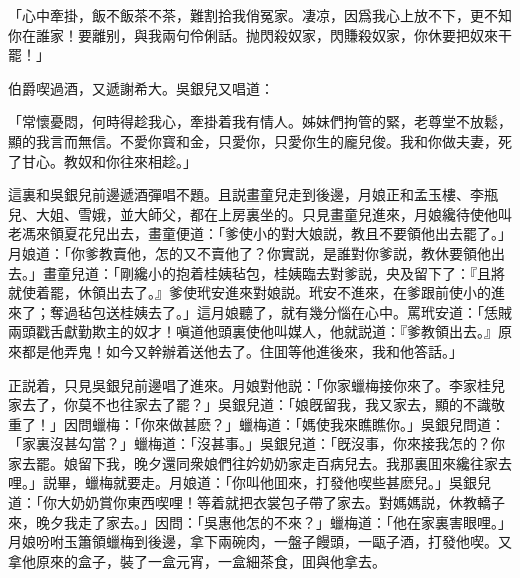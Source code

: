 \begin{myquote}
「心中牽掛，飯不飯茶不茶，難割拾我俏冤家。凄凉，因爲我心上放不下，更不知你在誰家！要離别，與我兩句伶俐話。抛閃殺奴家，閃賺殺奴家，你休要把奴來干罷！」
\end{myquote}

伯爵喫過酒，又遞謝希大。吳銀兒又唱道：

\begin{myquote}
「常懷憂悶，何時得趁我心，牽掛着我有情人。姊妹們拘管的緊，老尊堂不放鬆，顯的我言而無信。不愛你寳和金，只愛你，只愛你生的龐兒俊。我和你做夫妻，死了甘心。教奴和你往來相趁。」
\end{myquote}

這裏和吳銀兒前邊遞酒彈唱不題。且説畫童兒走到後邊，月娘正和孟玉樓、李瓶兒、大姐、雪娥，並大師父，都在上房裏坐的。只見畫童兒進來，月娘纔待使他叫老馮來領夏花兒出去，畫童便道：「爹使小的對大娘説，教且不要領他出去罷了。」月娘道：「你爹教賣他，怎的又不賣他了？你實説，是誰對你爹説，教休要領他出去。」畫童兒道：「剛纔小的抱着桂姨毡包，桂姨臨去對爹説，央及留下了：『且將就使着罷，休領出去了。』爹使玳安進來對娘説。玳安不進來，在爹跟前使小的進來了；奪過毡包送桂姨去了。」這月娘聽了，就有幾分惱在心中。罵玳安道：「恁賊兩頭戳舌獻勤欺主的奴才！嗔道他頭裏使他叫媒人，他就説道：『爹教領出去。』原來都是他弄鬼！如今又幹辦着送他去了。住囬等他進後來，我和他答話。」

正説着，只見吳銀兒前邊唱了進來。月娘對他説：「你家蠟梅接你來了。李家桂兒家去了，你莫不也往家去了罷？」吳銀兒道：「娘旣留我，我又家去，顯的不識敬重了！」因問蠟梅：「你來做甚麽？」蠟梅道：「媽使我來瞧瞧你。」吳銀兒問道：「家裏沒甚勾當？」蠟梅道：「沒甚事。」吳銀兒道：「旣沒事，你來接我怎的？你家去罷。娘留下我，晚夕還同衆娘們往妗奶奶家走百病兒去。我那裏囬來纔往家去哩。」説畢，蠟梅就要走。月娘道：「你叫他囬來，打發他喫些甚麽兒。」吳銀兒道：「你大奶奶賞你東西喫哩！等着就把衣裳包子帶了家去。對媽媽説，休教轎子來，晚夕我走了家去。」因問：「吳惠他怎的不來？」蠟梅道：「他在家裏害眼哩。」月娘吩咐玉簫領蠟梅到後邊，拿下兩碗肉，一盤子饅頭，一甌子酒，打發他喫。又拿他原來的盒子，裝了一盒元宵，一盒細茶食，囬與他拿去。

